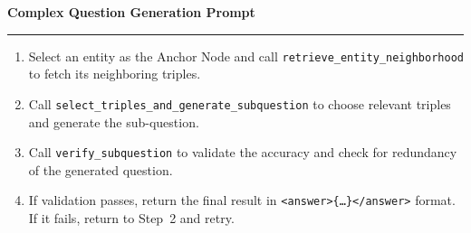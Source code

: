 \begin{table}[t!]
\centering
\caption{\textbf{Prompt for backward expansion.}}
\label{tab:complex_question_gen_prompt}
 
\begin{minipage}{\textwidth}
\begin{mdframed}[style=outerframe]
 
\begin{center}
  {\small\textbf{Complex Question Generation Prompt}}
\end{center}
\noindent\rule{\linewidth}{0.4pt}
 
 
\vspace{4pt}
\begin{mdframed}[style=subframe]
 
 
\vspace{6pt}
\begin{enumerate}[leftmargin=*, labelindent=0pt, labelsep=0.6em, itemsep=1pt, topsep=2pt, label=\textbf{Step \arabic*}]
  \small
  \item  Select an entity as the Anchor Node and call \texttt{retrieve\_entity\_neighborhood} to fetch its neighboring triples.
  \item  Call \texttt{select\_triples\_and\_generate\_subquestion} to choose relevant triples and generate the sub-question.
  \item  Call \texttt{verify\_subquestion} to validate the accuracy and check for redundancy of the generated question.
  \item If validation passes, return the final result in \texttt{<answer>\{{\ldots}\}</answer>} format. If it fails, return to Step~2 and retry.
\end{enumerate}
 
\vspace{6pt}
 

\end{mdframed}
\end{mdframed}
\end{minipage}
\end{table}
